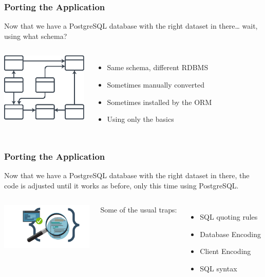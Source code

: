 \documentclass{beamer}
\begin{document}
\begin{frame}[fragile]
  \frametitle{Porting the Application}

  Now that we have a PostgreSQL database with the right dataset in there…
  wait, using what schema?

  \vfill
  
  \begin{columns}[c]
    \begin{center}
      \includegraphics[height=9em]{dbschema.eps}
    \end{center}

    \begin{itemize}
    \item Same schema, different RDBMS
    \item Sometimes manually converted
    \item Sometimes installed by the ORM
    \item Using only the basics
    \end{itemize}
  \end{columns}
\end{frame}

\begin{frame}[fragile]
  \frametitle{Porting the Application}

  Now that we have a PostgreSQL database with the right dataset in there,
  the code is adjusted until it works as before, only this time using
  PostgreSQL.

  \vfill
  
  \begin{columns}[c]
    \includegraphics[height=6em]{editing-your-code.png}

    Some of the usual traps:
    
    \begin{itemize}
    \item SQL quoting rules
    \item Database Encoding
    \item Client Encoding
    \item SQL syntax
    \end{itemize}
  \end{columns}
\end{frame}
\end{document}
